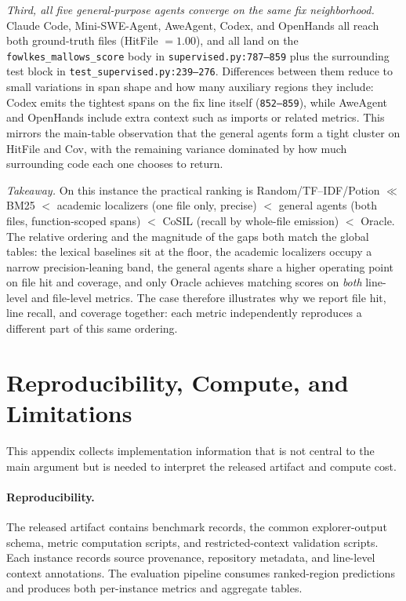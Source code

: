 \emph{Third, all five general-purpose agents converge on the same fix neighborhood.}
Claude Code, Mini-SWE-Agent, AweAgent, Codex, and OpenHands all reach both ground-truth files (HitFile $=1.00$), and all land on the \texttt{fowlkes\_mallows\_score} body in \texttt{supervised.py:787--859} plus the surrounding test block in \texttt{test\_supervised.py:239--276}. Differences between them reduce to small variations in span shape and how many auxiliary regions they include: Codex emits the tightest spans on the fix line itself (\texttt{852--859}), while AweAgent and OpenHands include extra context such as imports or related metrics. This mirrors the main-table observation that the general agents form a tight cluster on HitFile and Cov, with the remaining variance dominated by how much surrounding code each one chooses to return.

\emph{Takeaway.}
On this instance the practical ranking is Random/TF--IDF/Potion $\ll$ BM25 $<$ academic localizers (one file only, precise) $<$ general agents (both files, function-scoped spans) $<$ CoSIL (recall by whole-file emission) $<$ Oracle. The relative ordering and the magnitude of the gaps both match the global tables: the lexical baselines sit at the floor, the academic localizers occupy a narrow precision-leaning band, the general agents share a higher operating point on file hit and coverage, and only Oracle achieves matching scores on \emph{both} line-level and file-level metrics. The case therefore illustrates why we report file hit, line recall, and coverage together: each metric independently reproduces a different part of this same ordering.



\section{Reproducibility, Compute, and Limitations}
\label{app:reproducibility}

This appendix collects implementation information that is not central to the
main argument but is needed to interpret the released artifact and compute cost.

\paragraph{Reproducibility.}
The released artifact contains benchmark records, the common explorer-output
schema, metric computation scripts, and restricted-context validation scripts.
Each instance records source provenance, repository metadata, and line-level
context annotations. The evaluation pipeline consumes ranked-region predictions
and produces both per-instance metrics and aggregate tables.

